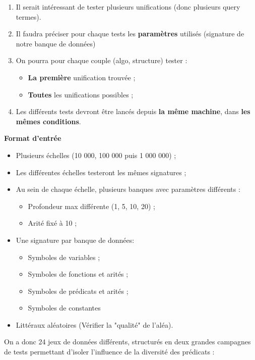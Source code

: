 \documentclass[11pt]{article}
\begin{document}
\begin{enumerate}
\begin{itemize}
            \item L'\textbf{espace mémoire} utilisé ;
            \item La \textbf{taille} des termes (en nombre de caractères) ;
            \item La \textbf{profondeur} des termes ;
            \item La \textbf{taille} des query termes (en nombre de caractères) ;
            \item La \textbf{profondeur} des query termes.
        \end{itemize}
        \item Il serait intéressant de tester plusieurs unifications (donc plusieurs query termes).
        \item Il faudra préciser pour chaque tests les \textbf{paramètres} utilisés (signature de notre banque de données)
        \item On pourra pour chaque couple (algo, structure) tester :
        \begin{itemize}
            \item \textbf{La première} unification trouvée ;
            \item \textbf{Toutes} les unifications possibles ;
        \end{itemize}
        \item Les différents tests devront être lancés depuis \textbf{la même machine}, dans \textbf{les mêmes conditions}.
   \end{enumerate}

\textbf{Format d'entrée}
    \begin{itemize}
        \item Plusieurs échelles (10 000, 100 000 puis 1 000 000) ;
        \item Les différentes échelles testeront les mêmes signatures ;
        \item Au sein de chaque échelle, plusieurs banques avec paramètres différents :
        \begin{itemize}
            \item Profondeur max différente (1, 5, 10, 20) ;
            \item Arité fixé à 10 ; 
        \end{itemize}   
        \item Une signature par banque de données:
        \begin{itemize}
            \item Symboles de variables ;
            \item Symboles de fonctions et arités ;
            \item Symboles de prédicats et arités ;
            \item Symboles de constantes
        \end{itemize}  
        \item Littéraux aléatoires (Vérifier la "qualité" de l'aléa).      
    \end{itemize}
    On a donc 24 jeux de données différents, structurés en deux grandes campagnes de tests permettant d'isoler l'influence de la diversité des prédicats :
\end{document}

